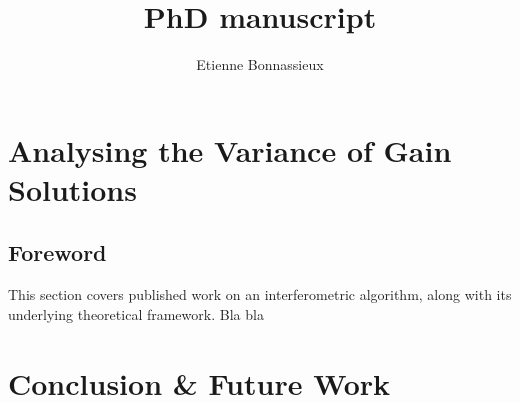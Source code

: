 \documentclass[11pt,a4paper,notitlepage]{book}
\author{Etienne Bonnassieux}
\title{PhD manuscript}
\begin{document}

%
%

\newpage
\setcounter{page}{1}




\chapter{Analysing the Variance of Gain Solutions}

\section{Foreword}
\pg
This section covers published work on an interferometric algorithm, along with its underlying theoretical framework. Bla bla



%
%











\chapter{Conclusion \& Future Work}



\appendix

%



\end{document}
